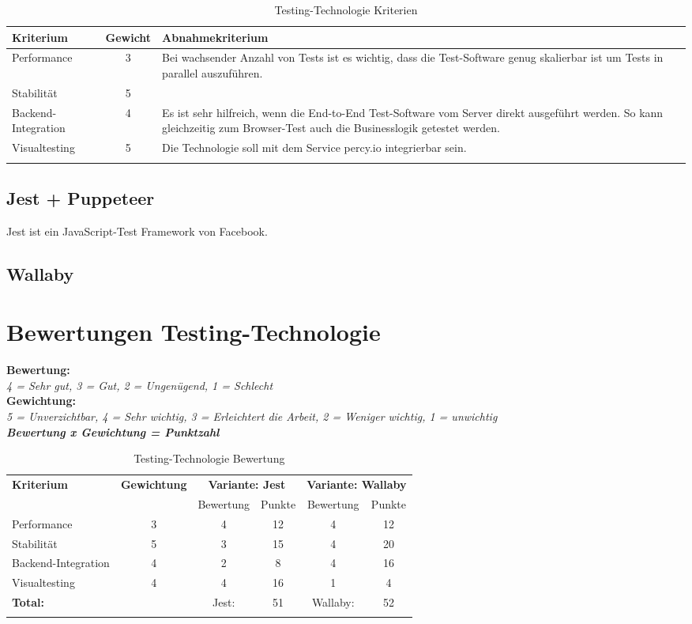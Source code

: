 \begin{longtable}[]{@{}p{2cm}cp{10cm}@{}}
  \toprule
  \textbf{Kriterium}  & \textbf{Gewicht} & \textbf{Abnahmekriterium}\tabularnewline
  \midrule
  \endhead
  Performance         & 3                & Bei wachsender Anzahl von Tests ist es wichtig, dass die Test-Software genug skalierbar ist um Tests in parallel auszuführen.\tabularnewline
  \midrule
  Stabilität          & 5                & \tabularnewline
  \midrule
  Backend-Integration & 4                & Es ist sehr hilfreich, wenn die End-to-End Test-Software vom Server direkt ausgeführt werden. So kann gleichzeitig zum Browser-Test auch die Businesslogik getestet werden.\tabularnewline
  \midrule
  Visualtesting       & 5                & Die Technologie soll mit dem Service percy.io integrierbar sein.\tabularnewline
  \bottomrule
  \caption{Testing-Technologie Kriterien}
\end{longtable}

\subsection{Jest + Puppeteer}

Jest ist ein JavaScript-Test Framework von Facebook.

\subsection{Wallaby}

\clearpage
\section{Bewertungen Testing-Technologie}\label{bewertungen-testing-technologie}

\textbf{Bewertung:}\\
\textit{4 = Sehr gut, 3 = Gut, 2 = Ungenügend, 1 = Schlecht}\\
\textbf{Gewichtung:}\\
\textit{5 = Unverzichtbar, 4 = Sehr wichtig, 3 = Erleichtert die Arbeit, 2 = Weniger wichtig, 1 = unwichtig}\\

\textbf{\textit{Bewertung x Gewichtung = Punktzahl}}

\begin{longtable}[]{@{}p{2cm}ccccc@{}}
  \toprule
  \textbf{Kriterium} & \textbf{Gewichtung} & \multicolumn{2}{c}{\textbf{Variante: Jest}} & \multicolumn{2}{c}{\textbf{Variante: Wallaby}}\tabularnewline
  & & Bewertung & Punkte & Bewertung & Punkte\tabularnewline
  \midrule
  \endhead
  Performance & 3 & 4 & 12 & 4 & 12\tabularnewline
  Stabilität & 5 & 3 & 15 & 4 & 20\tabularnewline
  Backend-Integration & 4 & 2 & 8 & 4 & 16\tabularnewline
  Visualtesting & 4 & 4 & 16 & 1 & 4\tabularnewline
  \midrule
  \textbf{Total:} & & Jest: & 51 & Wallaby: & 52\tabularnewline
  \bottomrule
  \caption{Testing-Technologie Bewertung}
\end{longtable}

